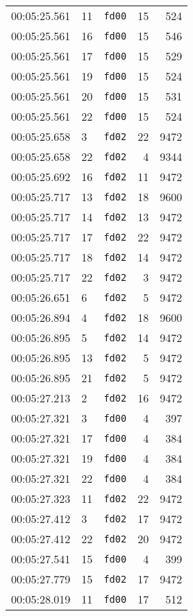 \documentclass{article}
\begin{document}
\begin{longtable}{lllrr}
00:05:25.561 & 11 & \texttt{fd00} & 15 & 524 \\
00:05:25.561 & 16 & \texttt{fd00} & 15 & 546 \\
00:05:25.561 & 17 & \texttt{fd00} & 15 & 529 \\
00:05:25.561 & 19 & \texttt{fd00} & 15 & 524 \\
00:05:25.561 & 20 & \texttt{fd00} & 15 & 531 \\
00:05:25.561 & 22 & \texttt{fd00} & 15 & 524 \\
00:05:25.658 & 3 & \texttt{fd02} & 22 & 9472 \\
00:05:25.658 & 22 & \texttt{fd02} & 4 & 9344 \\
00:05:25.692 & 16 & \texttt{fd02} & 11 & 9472 \\
00:05:25.717 & 13 & \texttt{fd02} & 18 & 9600 \\
00:05:25.717 & 14 & \texttt{fd02} & 13 & 9472 \\
00:05:25.717 & 17 & \texttt{fd02} & 22 & 9472 \\
00:05:25.717 & 18 & \texttt{fd02} & 14 & 9472 \\
00:05:25.717 & 22 & \texttt{fd02} & 3 & 9472 \\
00:05:26.651 & 6 & \texttt{fd02} & 5 & 9472 \\
00:05:26.894 & 4 & \texttt{fd02} & 18 & 9600 \\
00:05:26.895 & 5 & \texttt{fd02} & 14 & 9472 \\
00:05:26.895 & 13 & \texttt{fd02} & 5 & 9472 \\
00:05:26.895 & 21 & \texttt{fd02} & 5 & 9472 \\
00:05:27.213 & 2 & \texttt{fd02} & 16 & 9472 \\
00:05:27.321 & 3 & \texttt{fd00} & 4 & 397 \\
00:05:27.321 & 17 & \texttt{fd00} & 4 & 384 \\
00:05:27.321 & 19 & \texttt{fd00} & 4 & 384 \\
00:05:27.321 & 22 & \texttt{fd00} & 4 & 384 \\
00:05:27.323 & 11 & \texttt{fd02} & 22 & 9472 \\
00:05:27.412 & 3 & \texttt{fd02} & 17 & 9472 \\
00:05:27.412 & 22 & \texttt{fd02} & 20 & 9472 \\
00:05:27.541 & 15 & \texttt{fd00} & 4 & 399 \\
00:05:27.779 & 15 & \texttt{fd02} & 17 & 9472 \\
00:05:28.019 & 11 & \texttt{fd00} & 17 & 512 \\

\end{longtable}
\end{document}
